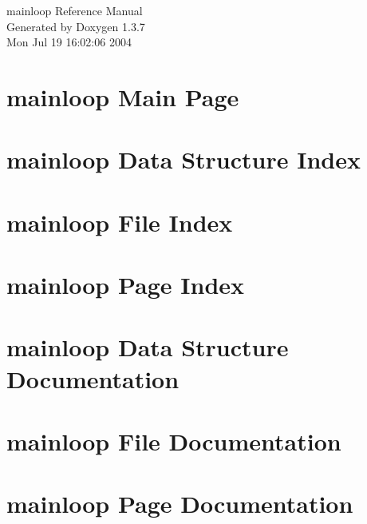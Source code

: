 \documentclass[a4paper]{book}
\begin{document}
\begin{titlepage}
\vspace*{7cm}
\begin{center}
{\Large mainloop Reference Manual}\\
\vspace*{1cm}
{\large Generated by Doxygen 1.3.7}\\
\vspace*{0.5cm}
{\small Mon Jul 19 16:02:06 2004}\\
\end{center}
\end{titlepage}
\clearemptydoublepage
{}
\tableofcontents
\clearemptydoublepage
{}
\chapter{mainloop Main Page}
\label{index}\hypertarget{index}{}
\chapter{mainloop Data Structure Index}

\chapter{mainloop File Index}

\chapter{mainloop Page Index}

\chapter{mainloop Data Structure Documentation}










\chapter{mainloop File Documentation}




\chapter{mainloop Page Documentation}

\printindex
\end{document}

